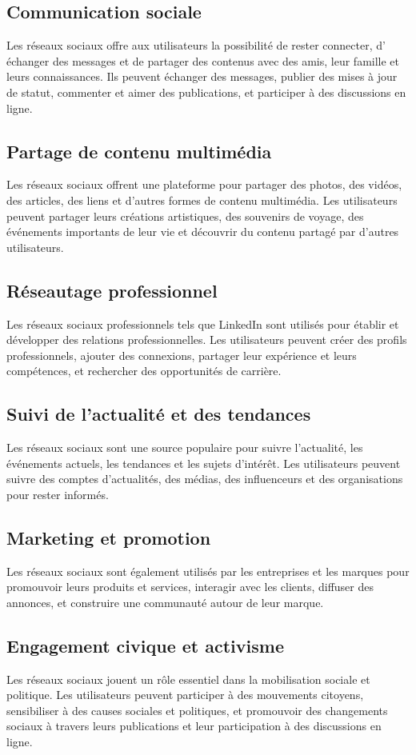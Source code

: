 \documentclass[12pt,a4paper,titlepage]{article}
\begin{document}
\subsection{Communication sociale  }
Les réseaux sociaux offre aux utilisateurs la possibilité  de rester connecter, d’ échanger des messages et de partager des contenus avec des amis, leur famille et leurs connaissances. Ils peuvent échanger des messages, publier des mises à jour de statut, commenter et aimer des publications, et participer à des discussions en ligne.\newline
\subsection{Partage de contenu multimédia  }
Les réseaux sociaux offrent une plateforme pour partager des photos, des vidéos, des articles, des liens et d'autres formes de contenu multimédia. Les utilisateurs peuvent partager leurs créations artistiques, des souvenirs de voyage, des événements importants de leur vie et découvrir du contenu partagé par d'autres utilisateurs.  \newline
\subsection{Réseautage professionnel}
Les réseaux sociaux professionnels tels que LinkedIn sont utilisés pour établir et développer des relations professionnelles. Les utilisateurs peuvent créer des profils professionnels, ajouter des connexions, partager leur expérience et leurs compétences, et rechercher des opportunités de carrière.
\subsection{Suivi de l'actualité et des tendances  }
Les réseaux sociaux sont une source populaire pour suivre l'actualité, les événements actuels, les tendances et les sujets d'intérêt. Les utilisateurs peuvent suivre des comptes d'actualités, des médias, des influenceurs et des organisations pour rester informés.
\subsection{Marketing et promotion}
Les réseaux sociaux sont également utilisés par les entreprises et les marques pour promouvoir leurs produits et services, interagir avec les clients, diffuser des annonces, et construire une communauté autour de leur marque. 
\subsection{Engagement civique et activisme  }
Les réseaux sociaux jouent un rôle essentiel dans la mobilisation sociale et politique. Les utilisateurs peuvent participer à des mouvements citoyens, sensibiliser à des causes sociales et politiques, et promouvoir des changements sociaux à travers leurs publications et leur participation à des discussions en ligne. 
\end{document}
